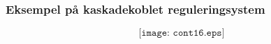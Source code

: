 \documentclass{beamer}
\begin{document}



\begin{frame}
	\frametitle{Eksempel på kaskadekoblet reguleringsystem}

	
$$\texttt{[image: cont16.eps]}$$

\end{frame}
\end{document}
